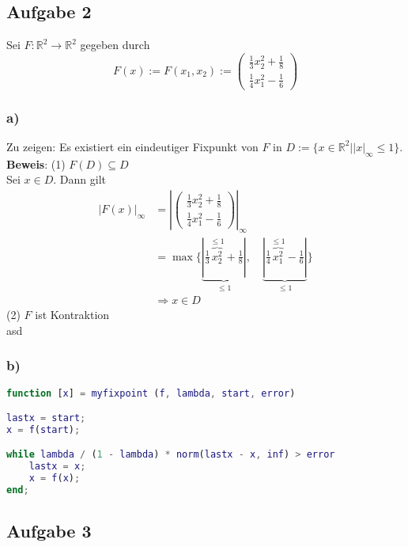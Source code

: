 \documentclass[11pt,a4paper,ngerman]{article}
\begin{document}
\subsection*{Aufgabe 2}
Sei $F: \mathbb{R}^2 \to \mathbb{R}^2$ gegeben durch 
$$ F(x) := F(x_1,x_2) := \left(\begin{array}{c}
\frac{1}{3}x_2^2+\frac{1}{8}\\
\frac{1}{4}x_1^2-\frac{1}{6}\end{array} \right)$$

\subsubsection*{a)}
Zu zeigen: Es existiert ein eindeutiger Fixpunkt von $F$ in 
$D := \{x\in \mathbb{R}^2 | \left|x\right|_\infty \leq 1 \}$. \\

\textbf{Beweis}: (1) $F(D) \subseteq D$ \\
Sei $x \in D$. Dann gilt
\begin{equation*}\begin{split}
\left|F(x)\right|_\infty &=  \left|\left(\begin{array}{c}
\frac{1}{3}x_2^2+\frac{1}{8}\\
\frac{1}{4}x_1^2-\frac{1}{6}\end{array} \right)\right|_\infty \\
     &= \max \{ \underbrace{|\frac{1}{3}\overbrace{x_2^2}^{\leq 1}+\frac{1}{8}|}_{\leq 1}, \quad 
                \underbrace{|\frac{1}{4}\overbrace{x_1^2}^{\leq 1}-\frac{1}{6} |}_{\leq 1} \} \\
     &\Rightarrow x \in D
\end{split}\end{equation*}
(2) $F$ ist Kontraktion\\
asd
\subsubsection*{b)}
\begin{lstlisting}[language=matlab]
function [x] = myfixpoint (f, lambda, start, error)

lastx = start;
x = f(start);

while lambda / (1 - lambda) * norm(lastx - x, inf) > error
    lastx = x;
    x = f(x);
end;
\end{lstlisting}
\subsection*{Aufgabe 3}
\end{document}
